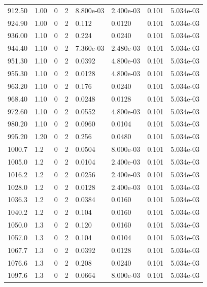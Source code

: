 \documentclass[preview]{standalone}
\begin{document}
{{{{{{\begin{tabular}{L{1.2cm}C{1.2cm} C{0.3cm}C{0.5cm} C{1.4cm}C{1.4cm} C{1.4cm}C{1.4cm}}
  912.50  &  1.00  & 0     &  2 &  8.800e-03  & 2.400e-03  & 0.101 &  5.034e-03   \\ 
  924.90  &  1.00  & 0     &  2 &  0.112  & 0.0120  & 0.101 &  5.034e-03   \\ 
  936.00  &  1.10  & 0     &  2 &  0.224  & 0.0240  & 0.101 &  5.034e-03   \\ 
  944.40  &  1.10  & 0     &  2 &  7.360e-03  & 2.480e-03  & 0.101 &  5.034e-03   \\ 
  951.30  &  1.10  & 0     &  2 &  0.0392  & 4.800e-03  & 0.101 &  5.034e-03   \\ 
  955.30  &  1.10  & 0     &  2 &  0.0128  & 4.800e-03  & 0.101 &  5.034e-03   \\ 
  963.20  &  1.10  & 0     &  2 &  0.176  & 0.0240  & 0.101 &  5.034e-03   \\ 
  968.40  &  1.10  & 0     &  2 &  0.0248  & 0.0128  & 0.101 &  5.034e-03   \\ 
  972.60  &  1.10  & 0     &  2 &  0.0552  & 4.800e-03  & 0.101 &  5.034e-03   \\ 
  980.20  &  1.10  & 0     &  2 &  0.0960  & 0.0104  & 0.101 &  5.034e-03   \\ 
  995.20  &  1.20  & 0     &  2 &  0.256  & 0.0480  & 0.101 &  5.034e-03   \\ 
  1000.7  &   1.2  & 0     &  2 &  0.0504  & 8.000e-03  & 0.101 &  5.034e-03   \\ 
  1005.0  &   1.2  & 0     &  2 &  0.0104  & 2.400e-03  & 0.101 &  5.034e-03   \\ 
  1016.2  &   1.2  & 0     &  2 &  0.0256  & 2.400e-03  & 0.101 &  5.034e-03   \\ 
  1028.0  &   1.2  & 0     &  2 &  0.0128  & 2.400e-03  & 0.101 &  5.034e-03   \\ 
  1036.3  &   1.2  & 0     &  2 &  0.0384  & 0.0160  & 0.101 &  5.034e-03   \\ 
  1040.2  &   1.2  & 0     &  2 &  0.104  & 0.0160  & 0.101 &  5.034e-03   \\ 
  1050.0  &   1.3  & 0     &  2 &  0.120  & 0.0160  & 0.101 &  5.034e-03   \\ 
  1057.0  &   1.3  & 0     &  2 &  0.104  & 0.0104  & 0.101 &  5.034e-03   \\ 
  1067.7  &   1.3  & 0     &  2 &  0.0392  & 0.0128  & 0.101 &  5.034e-03   \\ 
  1076.6  &   1.3  & 0     &  2 &  0.208  & 0.0240  & 0.101 &  5.034e-03   \\ 
  1097.6  &   1.3  & 0     &  2 &  0.0664  & 8.000e-03  & 0.101 &  5.034e-03   \\ 

\end{tabular}}}}}}}
\end{document}
